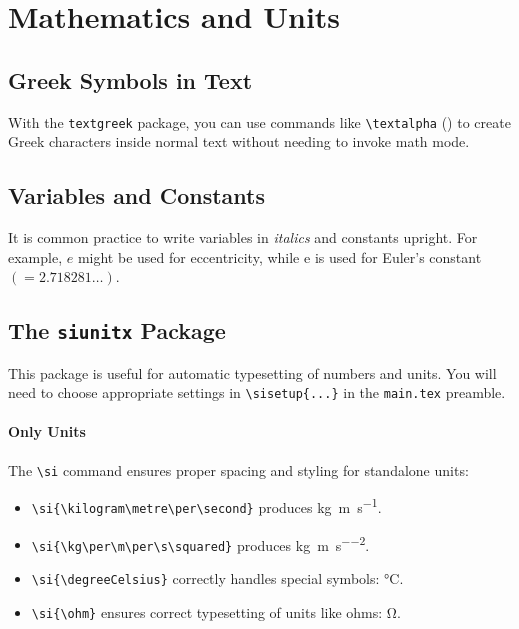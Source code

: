 \section{Mathematics and Units}

\subsection{Greek Symbols in Text}

With the \verb|textgreek| package, you can use commands like \verb|\textalpha| (\textalpha) to create Greek characters inside normal text without needing to invoke math mode.

\subsection{Variables and Constants}

It is common practice to write variables in \textit{italics} and constants upright. For example, $e$ might be used for eccentricity, while $\mathrm{e}$ is used for Euler's constant $(=\num{2.718281}\dots)$.


\subsection{The \texttt{siunitx} Package}

This package is useful for automatic typesetting of numbers and units. You will need to choose appropriate settings in \verb|\sisetup{...}| in the \verb|main.tex| preamble. %

\paragraph*{Only Units}

The \verb|\si| command ensures proper spacing and styling for standalone units:
\begin{itemize}
    \item \verb|\si{\kilogram\metre\per\second}| produces \si{\kilogram\metre\per\second}.
    \item \verb|\si{\kg\per\m\per\s\squared}| produces \si{\kg\per\m\per\s\squared}.
    \item \verb|\si{\degreeCelsius}| correctly handles special symbols: \si{\degreeCelsius}.
    \item \verb|\si{\ohm}| ensures correct typesetting of units like ohms: \si{\ohm}.
\end{itemize}


